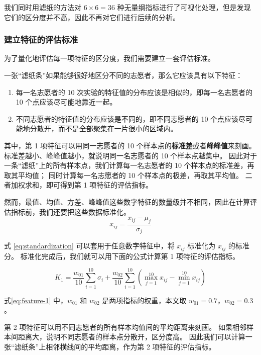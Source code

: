 \documentclass[withoutpreface]{cumcmthesis}
\begin{document}
我们同时用滤纸的方法对 $6 \times 6 = 36$ 种无量纲指标进行了可视化处理，但是发现它们的区分度并不高，因此不再对它们进行后续的分析。

\subsubsection{建立特征的评估标准}
\label{feature_evaluation}

为了量化地评估每一项特征的区分度，我们需要建立一套评估标准。

一张“滤纸条”如果能够很好地区分不同的志愿者，那么它应该具有以下特征：

\begin{enumerate}
    \item 每一名志愿者的 10 次实验的特征值的分布应该是相似的，即每一名志愿者的 10 个点应该尽可能地靠近一起。
    \item 不同志愿者的特征值的分布应该是不同的，即不同志愿者的 10 个点应该尽可能地分散开，而不是全部聚集在一片很小的区域内。
\end{enumerate}

其中，第 1 项特征可以用同一志愿者的 10 个样本点的\textbf{标准差}或者\textbf{峰峰值}来刻画。
标准差越小、峰峰值越小，就说明同一名志愿者的 10 个样本点越集中。
因此对于一条“滤纸”上的所有样本点，我们计算每一名志愿者的 10 个样本点的标准差，再取其平均值；
同时计算每一名志愿者的 10 个样本点的极差，再取其平均值。
二者加权求和，即可得到第 1 项特征的评估指标。

然而，最值、均值、方差、峰峰值这些数字特征的数量级并不相同，因此在计算评估指标前，我们还要把这些数据标准化。
\begin{equation}
    \label{eq:standardization}
    x_{ij} = \frac{x_{ij} - \mu_j}{\sigma_j}
\end{equation}

式 \cref{eq:standardization} 可以套用于任意数字特征中，将 $x_{ij}$ 标准化为 $x_{ij}$ 的标准分。
标准化完成后，我们就可以用下面的公式计算第 1 项特征的评估指标。

\begin{equation}
    \label{eq:feature-1}
    K_1 = \frac{w_{01}}{10} \sum_{i=1}^{10} \sigma_i + \frac{w_{02}}{10} \sum_{i=1}^{10} \left( \max_{j=1}^{10} x_{ij} - \min_{j=1}^{10} x_{ij} \right)
\end{equation}

式\cref{eq:feature-1} 中，$w_{01}$ 和 $w_{02}$ 是两项指标的权重，本文取 $w_{01} = 0.7$，$w_{02} = 0.3$。

第 2 项特征可以用不同志愿者的所有样本均值间的平均距离来刻画。
如果相邻样本间距离大，说明不同志愿者的样本点分散开，区分度高。
因此我们可以计算一张“滤纸条”上相邻横线间的平均距离，作为第 2 项特征的评估指标。
\end{document}
